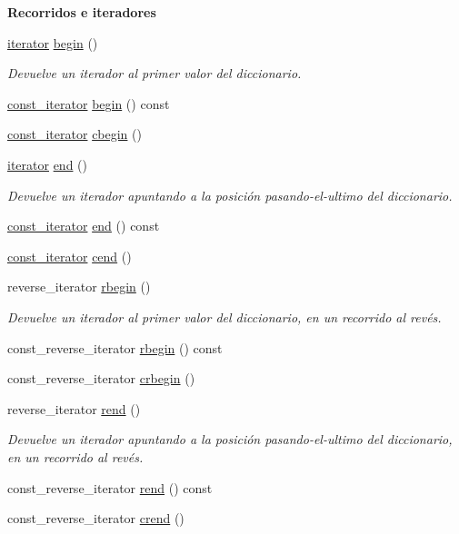 \begin{Indent}{\bf \-Recorridos e iteradores}\par
\begin{DoxyCompactItemize}
\item 
\hyperlink{classaed2_1_1map_1_1iterator}{iterator} \hyperlink{classaed2_1_1map_a58a95705d54b3dda7f775ce5a22225cb}{begin} ()
\begin{DoxyCompactList}\small\item\em \-Devuelve un iterador al primer valor del diccionario. \end{DoxyCompactList}\item 
\hyperlink{classaed2_1_1map_1_1const__iterator}{const\-\_\-iterator} \hyperlink{classaed2_1_1map_a1d10432d305bcb5f1af6ab7b75c27c1c}{begin} () const 
\item 
\hyperlink{classaed2_1_1map_1_1const__iterator}{const\-\_\-iterator} \hyperlink{classaed2_1_1map_ab96ad892caa28f193481a578f4956a2a}{cbegin} ()
\item 
\hyperlink{classaed2_1_1map_1_1iterator}{iterator} \hyperlink{classaed2_1_1map_a76023e6a56cb625513e1b5ea028bf983}{end} ()
\begin{DoxyCompactList}\small\item\em \-Devuelve un iterador apuntando a la posición pasando-\/el-\/ultimo del diccionario. \end{DoxyCompactList}\item 
\hyperlink{classaed2_1_1map_1_1const__iterator}{const\-\_\-iterator} \hyperlink{classaed2_1_1map_a1f847ad4fd46883ac60d764967172179}{end} () const 
\item 
\hyperlink{classaed2_1_1map_1_1const__iterator}{const\-\_\-iterator} \hyperlink{classaed2_1_1map_a7bb91e94cbc875f1a011b142ef877912}{cend} ()
\item 
reverse\-\_\-iterator \hyperlink{classaed2_1_1map_ac412d3902112122c1bffe2d4283a4e9d}{rbegin} ()
\begin{DoxyCompactList}\small\item\em \-Devuelve un iterador al primer valor del diccionario, en un recorrido al revés. \end{DoxyCompactList}\item 
const\-\_\-reverse\-\_\-iterator \hyperlink{classaed2_1_1map_aa68b6888ae3e256203d4ef273c293586}{rbegin} () const 
\item 
const\-\_\-reverse\-\_\-iterator \hyperlink{classaed2_1_1map_a6ad62765a2b2e00247b9e35a7542b448}{crbegin} ()
\item 
reverse\-\_\-iterator \hyperlink{classaed2_1_1map_a277f03b4f4b6b98879e4e4921081801f}{rend} ()
\begin{DoxyCompactList}\small\item\em \-Devuelve un iterador apuntando a la posición pasando-\/el-\/ultimo del diccionario, en un recorrido al revés. \end{DoxyCompactList}\item 
const\-\_\-reverse\-\_\-iterator \hyperlink{classaed2_1_1map_aafce6e53c53c460897613747fec89f9d}{rend} () const 
\item 
const\-\_\-reverse\-\_\-iterator \hyperlink{classaed2_1_1map_a40933b2efe1cb479de9195ea947244d1}{crend} ()
\end{DoxyCompactItemize}
\end{Indent}
